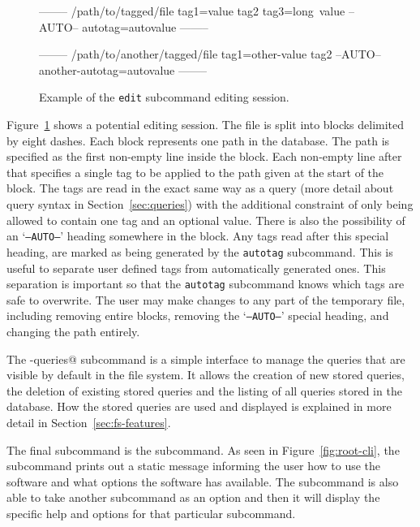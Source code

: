 \begin{figure}[h]
    \centering
    \begin{boxedverbatim}


--------
/path/to/tagged/file
tag1=value
tag2
tag3=long\ value
--AUTO--
autotag=autovalue
--------

--------
/path/to/another/tagged/file
tag1=other-value
tag2
--AUTO--
another-autotag=autovalue
--------
    \end{boxedverbatim}
    \label{fig:edit-subcommand-format}
    \caption{Example of the \texttt{edit} subcommand editing session.}
\end{figure}

Figure~\ref{fig:edit-subcommand-format} shows a potential editing session. The
file is split into blocks delimited by eight dashes. Each block represents one
path in the database. The path is specified as the first non-empty line inside
the block. Each non-empty line after that specifies a single tag to be applied
to the path given at the start of the block. The tags are read in the exact
same way as a query (more detail about query syntax in
Section~\ref{sec:queries}) with the additional constraint of only being
allowed to contain one tag and an optional value. There is also the possibility
of an `\texttt{--AUTO--}' heading somewhere in the block. Any tags read after
this special heading, are marked as being generated by the \texttt{autotag}
subcommand. This is useful to separate user defined tags from automatically
generated ones. This separation is important so that the \texttt{autotag}
subcommand knows which tags are safe to overwrite. The user may make changes to
any part of the temporary file, including removing entire blocks, removing the
`\texttt{--AUTO--}' special heading, and changing the path entirely.

The \verb@stored-queries@ subcommand is a simple interface to manage the
queries that are visible by default in the file system. It allows the creation
of new stored queries, the deletion of existing stored queries and the listing
of all queries stored in the database. How the stored queries are used and
displayed is explained in more detail in Section~\ref{sec:fs-features}.

The final subcommand is the \verb@help@ subcommand. As seen in
Figure~\ref{fig:root-cli}, the \verb@help@ subcommand prints out a static
message informing the user how to use the software and what options the
software has available. The \verb@help@ subcommand is also able to take another
subcommand as an option and then it will display the specific help and options
for that particular subcommand.

